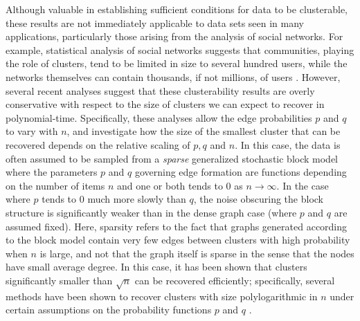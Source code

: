 \documentclass[twoside,11pt]{article}
\newcommand{\0}{\bs{0}}
\newcommand{\ra}{\rightarrow}
\begin{document}
Although valuable in establishing sufficient conditions for data to be clusterable, these results are not immediately
applicable to data sets seen in many applications, particularly those arising from the analysis of social networks.
For example, statistical analysis of social networks suggests that communities, playing the role of clusters,
tend to be limited in size to several hundred users, while the networks themselves can contain thousands, if not millions,
of users \citep{leskovec2008statistical, leskovec2009community}.
However, several recent analyses \citep{chen2014clustering,chen2014statistical, guedon2015community,jalali2015relative, rohe2012highest} suggest that these clusterability results are overly
conservative with respect to the size of clusters we can expect to recover in polynomial-time.
Specifically, these analyses allow the edge probabilities $p$ and
$q$ to vary with $n$, and investigate how the size of the smallest cluster
that can be recovered depends on the relative scaling of $p,q$ and $n$.
In this case, the data is often assumed to be sampled from a \emph{sparse} generalized stochastic block model where the parameters
\(p\) and \(q\) governing edge formation are functions depending on the number of items \(n\) and one
or both tends to \(0\) as \(n \ra \infty\). In the case where \(p \) tends to \(0\) much more slowly than \(q\), the noise
obscuring the block structure is significantly weaker than in the dense graph case (where \(p\) and \(q\) are assumed fixed).
Here, sparsity refers to the fact that graphs
generated according to the block model contain very few edges
between
clusters with high probability when $n$ is large,
and not that the graph itself is sparse in the sense that the nodes
have small average degree.
In this %
case, it has been shown that clusters significantly smaller than
\(\sqrt{n}\) can be recovered efficiently;
specifically, several methods have been shown to recover clusters with size polylogarithmic in \(n\)
under certain assumptions on the probability functions \(p\) and \(q\)  \citep[see][]{chen2014clustering,chen2014statistical, guedon2015community,rohe2012highest}.
\end{document}

